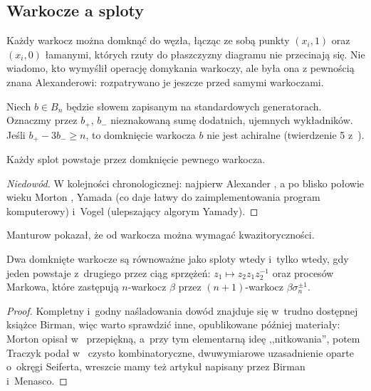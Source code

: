 
\subsection{Warkocze a sploty}
Każdy warkocz można domknąć do węzła, łącząc ze sobą punkty $(x_i, 1)$ oraz $(x_i, 0)$
łamanymi, których rzuty do płaszczyzny diagramu nie przecinają się.
%
Nie wiadomo, kto wymyślił operację domykania warkoczy, ale była ona z pewnością znana Alexanderowi: rozpatrywano je jeszcze przed samymi warkoczami.
%

Niech $b \in B_n$ będzie słowem zapisanym na standardowych generatorach.
Oznaczmy przez $b_+$, $b_-$ nieznakowaną sumę dodatnich, ujemnych wykładników.
Jeśli $b_+ - 3b_- \ge n$, to domknięcie warkocza $b$ nie jest achiralne (twierdzenie 5 z~\cite{jones85}).
%

\begin{theorem}[Alexander, 1923]
     Każdy splot powstaje przez domknięcie pewnego warkocza.
\end{theorem}

\begin{proof}[Niedowód]
%
%
%
%
    W kolejności chronologicznej:
    najpierw Alexander \cite{alexander23},
    a po blisko połowie wieku Morton \cite{mortonhr86},
    Yamada \cite{yamada87} (co daje łatwy do zaimplementowania program komputerowy)
    i~Vogel \cite{vogel90} (ulepszający algorym Yamady).
\end{proof}

Manturow \cite{manturov02} pokazał, że od warkocza można wymagać kwazitoryczności.
%

\begin{theorem}[Markow, 1936]
%
\label{markov_theorem}
    Dwa domknięte warkocze są równoważne jako sploty wtedy i~tylko wtedy,
    gdy jeden powstaje z~drugiego przez ciąg
    sprzężeń: $z_1 \mapsto z_2 z_1 z_2^{-1}$ oraz procesów Markowa,
    które zastępują $n$-warkocz $\beta$ przez $(n+1)$-warkocz $\beta\sigma_n^{\pm 1}$.
\end{theorem}

\begin{proof}
%
%
%
%
    Kompletny i~godny naśladowania dowód znajduje się w~trudno dostępnej książce \cite{birman74} Birman, więc warto sprawdzić inne, opublikowane później materiały:
    Morton opisał w~\cite{mortonhr86} przepiękną, a~przy tym elementarną ideę ,,nitkowania'',
    potem Traczyk podał w~\cite{traczyk98} czysto kombinatoryczne, dwuwymiarowe uzasadnienie oparte o~okręgi Seiferta,
    wreszcie mamy też artykuł \cite{birman02} napisany przez Birman i~Menasco.
\end{proof}

